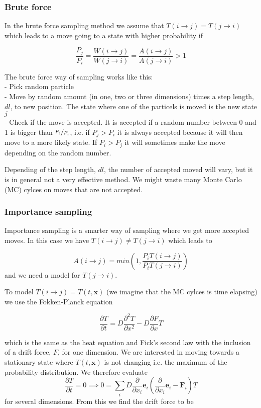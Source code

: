 \subsubsection{Brute force}

In the brute force sampling method we assume that $ T(i\rightarrow j) = T(j\rightarrow i)$ which leads to a move going to a state with higher probability if

$$ \frac{P_j}{P_i} = \frac{W(i\rightarrow j)}{W(j\rightarrow i)} = \frac{A(i\rightarrow j)}{A(j\rightarrow i)} > 1$$

The brute force way of sampling works like this:\\
- Pick random particle \\
- Move by random amount (in one, two or three dimensions) times a step length, $dl$, to new position. The state where one of the particels is moved is the new state $j$\\
- Check if the move is accepted. It is accepted if a random number between 0 and 1 is bigger than $\nicefrac{P_j}{P_i}$, i.e. if $P_j>P_i$ it is always accepted  because it will then move to a more likely state. If $P_i>P_j$ it will sometimes make the move depending on the random number.

Depending of the step length, $dl$, the number of accepted moved will vary, but it is in general not a very effective method. We might waste many Monte Carlo (MC) cylces on moves that are not accepted.

\subsubsection{Importance sampling}

Importance sampling is a smarter way of sampling where we get more accepted moves. In this case we have $ T(i\rightarrow j) \neq T(j\rightarrow i)$ which leads to

$$  A(i\rightarrow j) = min\left( 1, \frac{P_i T(i\rightarrow j)}{P_i T(j\rightarrow i)}  \right)$$ and we need a model for  $T(j\rightarrow i)$.

To model $T (i \rightarrow j) = T(t, \mathbf{x} )$ (we imagine that the MC cylces is time elapsing) we use the Fokken-Planck equation 

$$ \frac{\partial T}{\partial t} = D \frac{\partial^2 T}{\partial x^2} - D \frac{\partial F}{\partial x} T $$

which is the same as the heat equation and Fick's second law with the inclusion of a drift force, $F$, for one dimension.  We are interested in moving towards a stationary state where $T (t, \mathbf{x})$ is not changing i.e. the maximum of the probability distribution. We therefore evaluate 
$$  \frac{\partial T}{\partial t} = 0 \implies 0 = \sum_i D \frac{\partial}{\partial x_i} \mathbf{e}_i \left( \frac{\partial}{\partial x_i} \mathbf{e}_i - \mathbf{F}_i\right) T $$
for several dimensions. From this we find the drift force to be 

